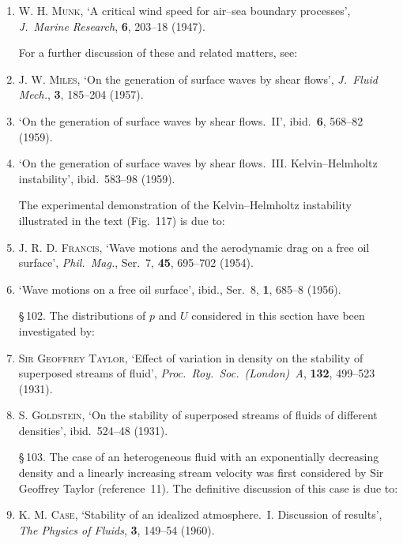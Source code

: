 \begin{enumerate}
\item \textsc{W. H. Munk}, `A critical wind speed for air--sea boundary processes',
  \emph{J.\ Marine Research}, \textbf{6}, 203--18 (1947).


\smallskip\noindent
For a further discussion of these and related matters, see:

\item \textsc{J. W. Miles}, `On the generation of surface waves by shear flows',
  \emph{J.\ Fluid Mech.}, \textbf{3}, 185--204 (1957).

\item \makebox[2em][l]{------} `On the generation of surface waves by shear flows.~II',
  ibid.\ \textbf{6}, 568--82 (1959).

\item \makebox[2em][l]{------} `On the generation of surface waves by shear flows.~III.
  Kelvin--Helmholtz instability', ibid.\ 583--98 (1959).

\smallskip\noindent
The experimental demonstration of the Kelvin--Helmholtz instability
illustrated in the text (Fig.~117) is due to:

\item \textsc{J. R. D. Francis}, `Wave motions and the aerodynamic drag on a free oil
  surface', \emph{Phil.\ Mag.}, Ser.~7, \textbf{45}, 695--702 (1954).

\item \makebox[2em][l]{------} `Wave motions on a free oil surface',
  ibid., Ser.~8, \textbf{1}, 685--8 (1956).

\medskip
\noindent\S\,102. The distributions of $p$ and $U$ considered in this section
have been investigated by:

\item \textsc{Sir Geoffrey Taylor}, `Effect of variation in density on the stability of
  superposed streams of fluid',
  \emph{Proc.\ Roy.\ Soc.\ (London)~A}, \textbf{132}, 499--523 (1931).

\item \textsc{S. Goldstein}, `On the stability of superposed streams of fluids of different
  densities', ibid.\ 524--48 (1931).

\medskip
\noindent\S\,103. The case of an heterogeneous fluid with an exponentially
decreasing density and a linearly increasing stream velocity was first
considered by Sir Geoffrey Taylor (reference~11). The definitive discussion
of this case is due to:

\item \textsc{K. M. Case}, `Stability of an idealized atmosphere.~I. Discussion of results',
  \emph{The Physics of Fluids}, \textbf{3}, 149--54 (1960).


\end{enumerate}

